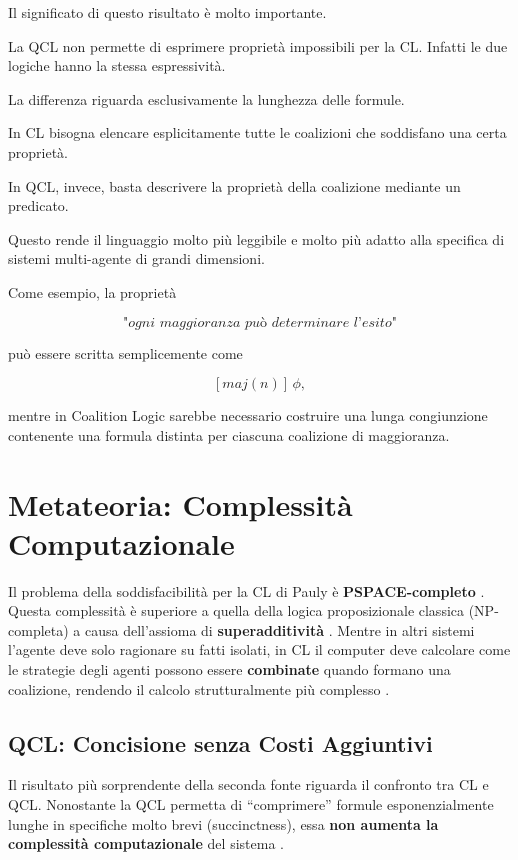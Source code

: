 \documentclass[12pt]{article}
\begin{document}
Il significato di questo risultato è molto importante.

La QCL non permette di esprimere proprietà impossibili per la CL.
Infatti le due logiche hanno la stessa espressività.

La differenza riguarda esclusivamente la lunghezza delle formule.

In CL bisogna elencare esplicitamente tutte le coalizioni che
soddisfano una certa proprietà.

In QCL, invece, basta descrivere la proprietà della coalizione mediante
un predicato.

Questo rende il linguaggio molto più leggibile e molto più adatto alla
specifica di sistemi multi-agente di grandi dimensioni.

Come esempio, la proprietà

\[
	\textit{"ogni maggioranza può determinare l'esito"}
\]

può essere scritta semplicemente come

\[
	[maj(n)]\,\phi,
\]

mentre in Coalition Logic sarebbe necessario costruire una lunga
congiunzione contenente una formula distinta per ciascuna coalizione di
maggioranza.
\section{Metateoria: Complessità Computazionale}
Il problema della soddisfacibilità per la CL di Pauly è \textbf{PSPACE-completo}
. Questa complessità è superiore a quella della logica
proposizionale classica (NP-completa) a causa dell'assioma di
\textbf{superadditività} . Mentre in altri sistemi l'agente deve solo
ragionare su fatti isolati, in CL il computer deve calcolare come le
strategie degli agenti possono essere \textbf{combinate} quando formano
una coalizione, rendendo il calcolo strutturalmente più complesso .

\subsection{QCL: Concisione senza Costi Aggiuntivi}

Il risultato più sorprendente della seconda fonte riguarda il confronto tra
CL e QCL. Nonostante la QCL permetta di ``comprimere'' formule
esponenzialmente lunghe in specifiche molto brevi (succinctness), essa
\textbf{non aumenta la complessità computazionale} del sistema .
\end{document}
